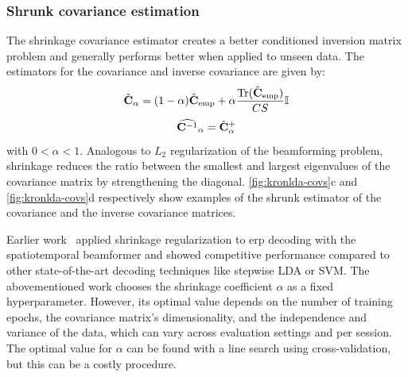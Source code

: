 	\subsubsection{Shrunk covariance estimation}
	\label{sec:stbf-struct/methods/shrunk-cov}
	The shrinkage covariance estimator creates a better conditioned inversion matrix problem and generally performs better when applied to unseen data.
	The estimators for the covariance and inverse covariance are given by:
	\begin{equation}
    \hat{\mathbf{C}}_\alpha =
    (1-\alpha) \hat{\mathbf{C}}_\text{emp}
    + \alpha\frac{\operatorname{Tr}(\hat{\mathbf{C}}_\text{emp})}{CS}\mathbb{I}
		\label{eq:shrinkage}
	\end{equation}
	\begin{equation}
    \widehat{\mathbf{C}^{-1}}_\alpha =
    \hat{\mathbf{C}}^+_\alpha
		\label{eq:stbf-struct/shrinkage-inv}
	\end{equation}
	with $0<\alpha<1$.
	Analogous to $L_2$ regularization of the beamforming problem,
	shrinkage reduces the ratio between the smallest and largest eigenvalues
	of the covariance matrix by strengthening the diagonal.
	\cref{fig:kronlda-covs}c and \cref{fig:kronlda-covs}d respectively show examples of the
	shrunk estimator of the covariance and the inverse covariance matrices.

	Earlier work~\cite{Libert2021} applied shrinkage regularization to \ac{erp}
	decoding with the spatiotemporal beamformer and showed competitive performance
	compared to other state-of-the-art decoding techniques like stepwise LDA or SVM.
	The abovementioned work chooses the shrinkage coefficient $\alpha$ as a fixed hyperparameter.
	However, its optimal value depends on the number of training epochs, the
	covariance matrix's dimensionality, and the independence and variance of the
	data, which can vary across evaluation settings and per session.
	The optimal value for $\alpha$ can be found with a line search using cross-validation, but this can be a costly procedure.

